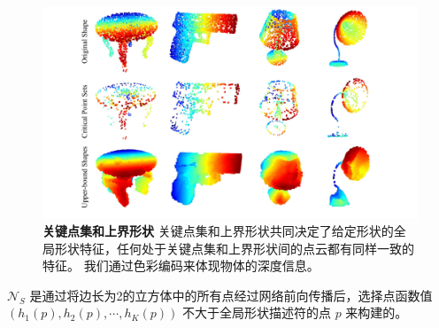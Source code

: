 
\begin{figure}[b]
    \centering
    \includegraphics[width=0.8\linewidth]{fig/kp_ss_visu1.pdf}
    \caption{\textbf{关键点集和上界形状} 关键点集和上界形状共同决定了给定形状的全局形状特征，任何处于关键点集和上界形状间的点云都有同样一致的特征。 我们通过色彩编码来体现物体的深度信息。}
    \label{fig:recon}
\end{figure}

$\mathcal{N}_S$ 是通过将边长为2的立方体中的所有点经过网络前向传播后，选择点函数值$(h_1(p), h_2(p), \cdots, h_K(p))$ 不大于全局形状描述符的点 $p$ 来构建的。

